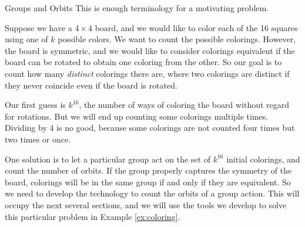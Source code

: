 \documentclass[12pt]{pom_thesis}
\begin{document}
\begin{chapter}{Groups and Orbits}
This is enough terminology for a motivating problem.

\begin{examp}\label{ex:coloring_init}
Suppose we have a $4 \times 4$ board, and we would like to color each of the 16 squares using one of $k$ possible colors. We want to count the possible colorings. However, the board is symmetric, and we would like to consider colorings equivalent if the board can be rotated to obtain one coloring from the other. So our goal is to count how many \emph{distinct} colorings there are, where two colorings are distinct if they never coincide even if the board is rotated.

Our first guess is $k^{16}$, the number of ways of coloring the board without regard for rotations. But we will end up counting some colorings multiple times. Dividing by 4 is no good, because some colorings are not counted four times but two times or once. 

One solution is to let a particular group act on the set of $k^{16}$ initial colorings, and count the number of orbits. If the group properly captures the symmetry of the board, colorings will be in the same group if and only if they are equivalent. So we need to develop the technology to count the orbits of a group action. This will occupy the next several sections, and we will use the tools we develop to solve this particular problem in Example \ref{ex:coloring}.
\end{examp}



\end{chapter}
\end{document}
